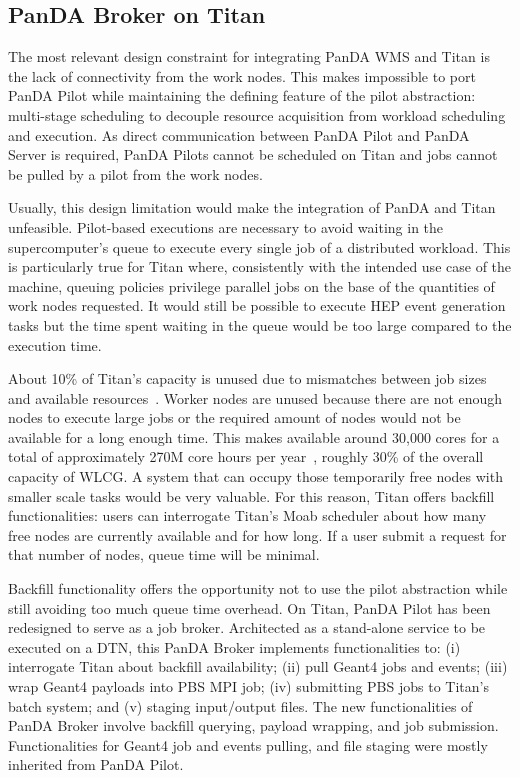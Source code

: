 \subsection{PanDA Broker on Titan}
\label{ssec:panda_titan}

The most relevant design constraint for integrating PanDA WMS and Titan is the
lack of connectivity from the work nodes. This makes impossible to port PanDA
Pilot while maintaining the defining feature of the pilot abstraction:
multi-stage scheduling to decouple resource acquisition from workload scheduling
and execution. As direct communication between PanDA Pilot and PanDA Server is
required, PanDA Pilots cannot be scheduled on Titan and jobs cannot be pulled by
a pilot from the work nodes.

Usually, this design limitation would make the integration of PanDA and Titan
unfeasible. Pilot-based executions are necessary to avoid waiting in the
supercomputer's queue to execute every single job of a distributed workload.
This is particularly true for Titan where, consistently with the intended use
case of the machine, queuing policies privilege parallel jobs on the base of the
quantities of work nodes requested. It would still be possible to execute HEP
event generation tasks but the time spent waiting in the queue would be too
large compared to the execution time.

About 10\% of Titan's capacity is unused due to mismatches between job sizes and
available resources~\cite{titan_utilization}. Worker nodes are unused because
there are not enough nodes to execute large jobs or the required amount of nodes
would not be available for a long enough time. This makes available around
30,000 cores for a total of approximately 270M core hours per
year~\cite{titan_free}, roughly 30\% of the overall capacity of WLCG. A system
that can occupy those temporarily free nodes with smaller scale tasks would be
very valuable. For this reason, Titan offers backfill functionalities: users can
interrogate Titan's Moab scheduler about how many free nodes are currently
available and for how long. If a user submit a request for that number of nodes,
queue time will be minimal.


Backfill functionality offers the opportunity not to use the pilot abstraction
while still avoiding too much queue time overhead. On Titan, PanDA Pilot has
been redesigned to serve as a job broker. Architected as a stand-alone service
to be executed on a DTN, this PanDA Broker implements functionalities to: (i)
interrogate Titan about backfill availability; (ii) pull Geant4 jobs and events;
(iii) wrap Geant4 payloads into PBS MPI job; (iv) submitting PBS jobs to Titan's
batch system; and (v) staging input/output files. The new functionalities of
PanDA Broker involve backfill querying, payload wrapping, and job submission.
Functionalities for Geant4 job and events pulling, and file staging were mostly
inherited from PanDA Pilot.


